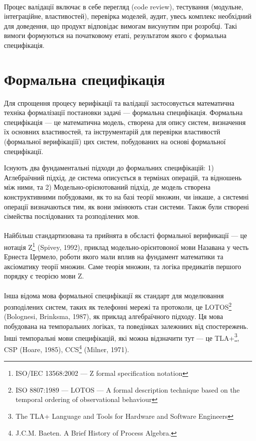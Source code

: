 \paragraph{}
Процес валідації включає в себе перегляд (code review),
тестування (модульне, інтеграційне, властивостей), перевірка моделей, аудит,
увесь комплекс необхідний для доведення, що продукт відповідає вимогам
висунутим при розробці. Такі вимоги формуються на початковому етапі,
результатом якого є формальна специфікація.

\section {Формальна специфікація}
Для спрощення процесу верифікації та валідації
застосовується математична техніка формалізації постановки задачі --- формальна специфікація.
Формальна специфікація --- це математична модель, створена для опису систем,
визначення їх основних властивостей, та інструментарій для перевірки
властивостй (формальної верифікаціїї) цих систем, побудованих на основі формальної специфікації.

Існують два фундаментальні підходи до формальних специфікацій: 1) Аглебраїчний підхід, де
система описується в термінах операцій, та відношень між ними, та
2) Модельно-орієнотований підхід, де модель створена конструктивними побудовами,
як то на базі теорії множин, чи інкаше, а системні операції визначаються тим, як вони змінюють
стан системи. Також були створені сімейства послідованих та розподілених мов.

\paragraph{}
Найбільш стандартизована та прийнята в обсласті формальної верификації --- це нотація
Z\footnote{ISO/IEC 13568:2002 --- Z formal specification notation} (Spivey, 1992), приклад
модельно-орієнтовоної мови
Назавана у честь Ернеста Цермело, роботи якого мали вплив на фундамент математики та аксіоматику
теорії множин. Саме теорія множин, та логіка предикатів першого порядку є теорією мови Z.

\paragraph{}
Інша відома мова формальної специфікації як стандарт для моделювання розподілених систем,
таких як телефонні мережі та протоколи, це
LOTOS\footnote{ISO 8807:1989 --- LOTOS --- A formal description technique based
on the temporal ordering of observational behaviour} (Bolognesi, Brinksma, 1987), як приклад алгебраїчного підходу.
Ця мова побудована на темпоральних логіках, та поведінках залежниих від спостережень.
Інші темпоральні мови специфікацій, які можна відзначити тут --- це TLA+\footnote{The
TLA+ Language and Tools for Hardware and Software Engineers}, CSP (Hoare, 1985),
CCS\footnote{J.C.M. Baeten. A Brief History of Process Algebra.} (Milner, 1971).

